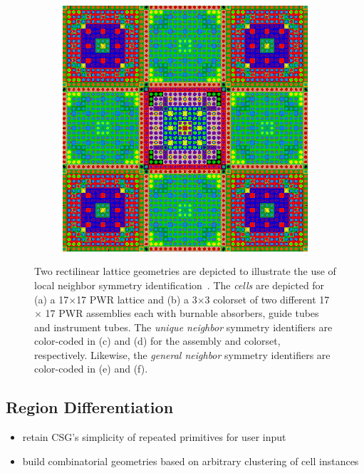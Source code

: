 \begin{figure}
\begin{subfigure}{.5\textwidth}
  \caption{}
  \label{fig:assm-neighbors}
\end{subfigure}
\begin{subfigure}{.5\textwidth}
  \centering
  \includegraphics[width=.7\linewidth]{figures/workflow/opencg/neighbor-cells-xy-colorset}
  \caption{}
  \label{fig:colorset-neighbors}
\end{subfigure}
\caption{Two rectilinear lattice geometries are depicted to illustrate the use of local neighbor symmetry identification~\cite{boyd2015opencg}. The \textit{cells} are depicted for (a) a 17$\times$17 PWR lattice and (b) a 3$\times$3 colorset of two different 17 $\times$ 17 PWR assemblies each with burnable absorbers, guide tubes and instrument tubes. The \textit{unique neighbor} symmetry identifiers are color-coded in (c) and (d) for the assembly and colorset, respectively. Likewise, the \textit{general neighbor} symmetry identifiers are color-coded in (e) and (f).}
\label{fig:neighbor-cells}
\end{figure}

\subsection{Region Differentiation}
\label{sec:chap4-region-diff}

\begin{itemize}[noitemsep]
  \item retain CSG's simplicity of repeated primitives for user input
  \item build combinatorial geometries based on arbitrary clustering of cell instances
\end{itemize}


